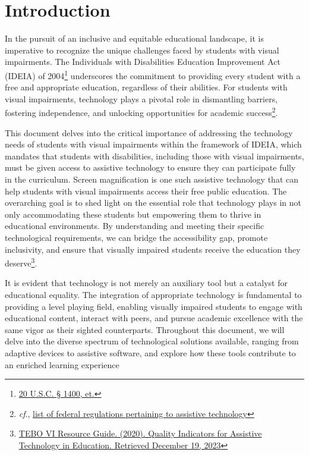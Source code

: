 \hypertarget{intro}{}\chapter*{Introduction}\label{intro}
\renewcommand{\cftchapleader}{\cftdotfill{\cftdotsep}}
\pagestyle{fancyplain}
\fancyfoot[C]{\thepage}
\noindent\makebox[\textwidth]{\rule{\linewidth}{0.4pt}}
In the pursuit of an inclusive and equitable educational landscape, it is imperative to recognize the unique challenges faced by students with visual impairments. The Individuals with Disabilities Education Improvement Act (IDEIA) of 2004\footnote{\raggedright \href{http://sites.ed.gov/idea/statuteregulations/}{20 U.S.C. § 1400, et.}} underscores the commitment to providing every student with a free and appropriate education, regardless of their abilities. For students with visual impairments, technology plays a pivotal role in dismantling barriers, fostering independence, and unlocking opportunities for academic success\footnote{\raggedright \textit{cf}., \href{http://ectacenter.org/topics/atech/laws.asp}{list of federal regulations pertaining to assistive technology}}.

This document delves into the critical importance of addressing the technology needs of students with visual impairments within the framework of IDEIA, which mandates that students with disabilities, including those with visual impairments, must be given access to assistive technology to ensure they can participate fully in the curriculum. Screen magnification is one such assistive technology that can help students with visual impairments access their free public education\footnotemark[\value{footnote}]. The overarching goal is to shed light on the essential role that technology plays in not only accommodating these students but empowering them to thrive in educational environments. By understanding and meeting their specific technological requirements, we can bridge the accessibility gap, promote inclusivity, and ensure that visually impaired students receive the education they deserve\footnote{\raggedright \href{https://qiat.org/new/wp-content/uploads/2020/06/TEBO_VI_Resource_Guide.pdf}{TEBO VI Resource Guide. (2020). Quality Indicators for Assistive Technology in Education. Retrieved December 19, 2023}}.

It is evident that technology is not merely an auxiliary tool but a catalyst for educational equality. The integration of appropriate technology is fundamental to providing a level playing field, enabling visually impaired students to engage with educational content, interact with peers, and pursue academic excellence with the same vigor as their sighted counterparts. Throughout this document, we will delve into the diverse spectrum of technological solutions available, ranging from adaptive devices to assistive software, and explore how these tools contribute to an enriched learning experience
